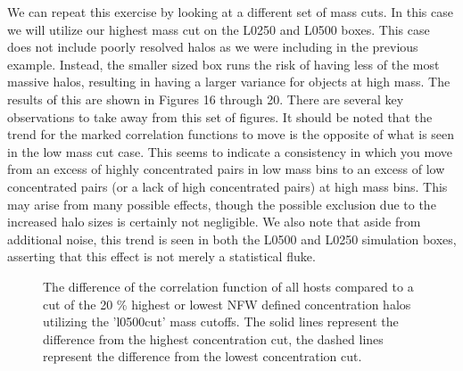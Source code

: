 \documentclass[usenatbib,usegraphicx,letterpaper]{mn2e}
\begin{document}
We can repeat this exercise by looking at a different set of mass cuts. In this case we will utilize our highest mass cut on the L0250 and L0500 boxes. This case does not include poorly resolved halos as we were including in the previous example. Instead, the smaller sized box runs the risk of having less of the most massive halos, resulting in having a larger variance for objects at high mass. The results of this are shown in Figures 16 through 20. There are several key observations to take away from this set of figures. It should be noted that the trend for the marked correlation functions to move is the opposite of what is seen in the low mass cut case. This seems to indicate a consistency in which you move from an excess of highly concentrated pairs in low mass bins to an excess of low concentrated pairs (or a lack of high concentrated pairs) at high mass bins. This may arise from many possible effects, though the possible exclusion due to the increased halo sizes is certainly not negligible. We also note that aside from additional noise, this trend is seen in both the L0500 and L0250 simulation boxes, asserting that this effect is not merely a statistical fluke.

\begin{figure}
	\centering
	\caption{The difference of the correlation function of all hosts compared to a cut of the 20 \% highest or lowest NFW defined concentration halos utilizing the 'l0500cut' mass cutoffs. The solid lines represent the difference from the highest concentration cut, the dashed lines represent the difference from the lowest concentration cut.}
\end{figure}
\end{document}
